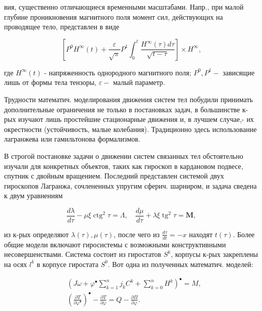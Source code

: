 \documentclass[10pt]{article}
\begin{document}
вия, существенно отличающиеся временными масштабами. Напр., при малой глубине проникновения магнитного поля момент сил, действующих на проводящее тело, представлен в виде



\[

\left[P^{0} H^{\infty}(t)+\frac{\varepsilon}{\sqrt{\pi}} P^{1} \int_{0}^{t} \frac{H^{\infty}(\tau) d \tau}{\sqrt{t-\tau}}\right] \times H^{\infty},

\]



где $H^{\infty}(t)$ - напряженность однородного магнитного поля; $P^{0}, P^{1}-$ зависящие лишь от формы тела тензоры, $\varepsilon-$ малый параметр.



Трудности математич. моделирования движения систем тел побудили принимать дополнительные ограничения не только в постановках задач, в большинстве к-рых изучают лишь простейшие стационарные движения и, в лучшем случае,- их окрестности (устойчивость, малые колебания). Традиционно здесь использование лагранжева или гамильтонова формализмов.



В строгой постановке задачи о движении систем связанных тел обстоятельно изучали для конкретных объектов, таких как гироскоп в кардановом подвесе, спутник с двойным вращением. Последний представлен системой двух гироскопов Лагранжа, сочлененных упругим сферич. шарниром, и задача сведена к двум уравнениям



\[

\frac{d \lambda}{d \tau}-\mu \xi \operatorname{ctg}^{2} \tau=\Lambda, \quad \frac{d \mu}{d \tau}+\lambda \xi \operatorname{tg}^{2} \tau=\mathbf{M},

\]



из к-рых определяют $\lambda(\tau), \mu(\tau)$, после чего из $\frac{d \tau}{d t}=-x$ находят $t(\tau)$. Более общие модели включают гиросистемы с возможными конструктивными несовершенствами. Система состоит из гиростатов $S^{k}$, корпусы к-рых закреплены на осях $l^{k}$ в корпусе гиростата $S^{0}$. Вот одна из полученных математич. моделей:



\[

\begin{aligned}

& \left(J \omega+\varphi^{\bullet} \sum_{k=1}^{n} j_{k} C^{k}+\sum_{k=0}^{n} H^{k}\right)^{\bullet}=M, \\

& \left(\frac{\partial T}{\partial \varphi^{\bullet}}\right)^{\bullet}-\frac{\partial T}{\partial \varphi}=Q-\frac{\partial \Pi}{\partial \varphi} .

\end{aligned}

\]
\end{document}
